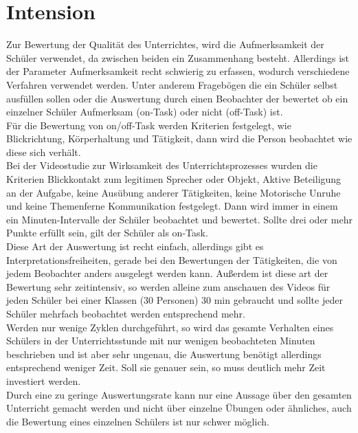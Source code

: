 \section{Intension}
\label{intension}
Zur Bewertung der Qualität des Unterrichtes, wird die Aufmerksamkeit der Schüler verwendet, da zwischen beiden ein Zusammenhang besteht. Allerdings ist der Parameter Aufmerksamkeit recht schwierig zu erfassen, wodurch verschiedene Verfahren verwendet werden. Unter anderem Fragebögen die ein Schüler selbst ausfüllen sollen oder die Auswertung durch einen Beobachter der bewertet ob ein einzelner Schüler Aufmerksam (on-Task) oder nicht (off-Task) ist.\\
Für die Bewertung von on/off-Task werden Kriterien festgelegt, wie Blickrichtung, Körperhaltung und Tätigkeit, dann wird die Person beobachtet wie diese sich verhält.\\
Bei der Videostudie zur Wirksamkeit des Unterrichtsprozesses wurden die Kriterien Blickkontakt zum legitimen Sprecher oder Objekt, Aktive Beteiligung an der Aufgabe, keine Ausübung anderer Tätigkeiten, keine Motorische Unruhe und keine Themenferne Kommunikation festgelegt. Dann wird immer in einem ein Minuten-Intervalle der Schüler beobachtet und bewertet. Sollte drei oder mehr Punkte erfüllt sein, gilt der Schüler als on-Task.\\
Diese Art der Auswertung ist recht einfach, allerdings gibt es Interpretationsfreiheiten, gerade bei den Bewertungen der Tätigkeiten, die von jedem Beobachter anders ausgelegt werden kann. Außerdem ist diese art der Bewertung sehr zeitintensiv, so werden alleine zum anschauen des Videos für jeden Schüler bei einer Klassen (30 Personen) 30 min gebraucht und sollte jeder Schüler mehrfach beobachtet werden entsprechend mehr.\\
Werden nur wenige Zyklen durchgeführt, so wird das gesamte Verhalten eines Schülers in der Unterrichtsstunde mit nur wenigen beobachteten Minuten beschrieben und ist aber sehr ungenau, die Auswertung benötigt allerdings entsprechend weniger Zeit. Soll sie genauer sein, so muss deutlich mehr Zeit investiert werden.\\
Durch eine zu geringe Auswertungsrate kann nur eine Aussage über den gesamten Unterricht gemacht werden und nicht über einzelne Übungen oder ähnliches, auch die Bewertung eines einzelnen Schülers ist nur schwer möglich.\\
\cite{aufmerksamkeit_Studie}